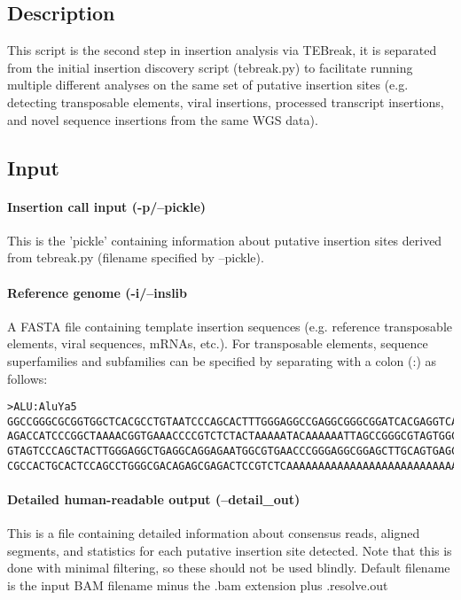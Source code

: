 \documentclass[letterpaper,11pt]{article}
\begin{document}
\subsection{Description}
This script is the second step in insertion analysis via TEBreak, it is separated from the initial insertion discovery script (tebreak.py) to facilitate running multiple different analyses on the same set of putative insertion sites (e.g. detecting transposable elements, viral insertions, processed transcript insertions, and novel sequence insertions from the same WGS data).

\subsection{Input}
\paragraph{Insertion call input (-p/--pickle)}
	This is the 'pickle' containing information about putative insertion sites derived from tebreak.py (filename specified by --pickle).
	
\paragraph{Reference genome (-i/--inslib}
A FASTA file containing template insertion sequences (e.g. reference transposable elements, viral sequences, mRNAs, etc.). For transposable elements, sequence superfamilies and subfamilies can be specified by separating with a colon (:) as follows:

\begin{verbatim}
>ALU:AluYa5
GGCCGGGCGCGGTGGCTCACGCCTGTAATCCCAGCACTTTGGGAGGCCGAGGCGGGCGGATCACGAGGTCAGGAGATCG
AGACCATCCCGGCTAAAACGGTGAAACCCCGTCTCTACTAAAAATACAAAAAATTAGCCGGGCGTAGTGGCGGGCGCCT
GTAGTCCCAGCTACTTGGGAGGCTGAGGCAGGAGAATGGCGTGAACCCGGGAGGCGGAGCTTGCAGTGAGCCGAGATCC
CGCCACTGCACTCCAGCCTGGGCGACAGAGCGAGACTCCGTCTCAAAAAAAAAAAAAAAAAAAAAAAAAAAAAAAAAAA
\end{verbatim}

\paragraph{Detailed human-readable output (--detail\_out)}
This is a file containing detailed information about consensus reads, aligned segments, and statistics for each putative insertion site detected. Note that this is done with minimal filtering, so these should not be used blindly. Default filename is the input BAM filename minus the .bam extension plus .resolve.out
\end{document}

